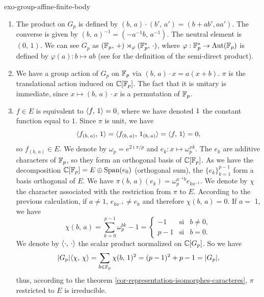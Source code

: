  
\begin{correction}{exo-group-affine-finite-body}
\begin{enumerate}
\item The product on $ G_p $ is defined by $ (b, \, a) \cdot (b', \, a') = (b + ab', aa') $. The converse is given by $ (b, \, a)^{-1} = (-a^{-1} b, \, a^{-1}) $. The neutral element is $ (0, \, 1) $. We can see $ G_p $ as $ (\mathbb{F}_p, \, +) \rtimes_\varphi (\mathbb{F}_p^*, \, \cdot) $, where $ \varphi: \mathbb{F}_p^* \rightarrow \text{Aut} ( \mathbb{F}_p) $ is defined by $ \varphi (a): b \mapsto ab $ (see \cite{perrin} for the definition of the semi-direct product).
\item {} We have a group action of $ G_p $ on $ \mathbb{F}_p $ via $ (b, \, a) \cdot x = a (x + b) $. $ \pi $ is the translational action induced on $ \mathbb{C} [\mathbb{F}_p] $. The fact that it is unitary is immediate, since $ x \mapsto (b, \, a) \cdot x $ is a permutation of $ \mathbb{F}_p $.
\item $ f \in E $ is equivalent to $ \langle f,\,1\rangle = 0 $, where we have denoted $ 1 $ the constant function equal to $ 1 $. Since $ \pi $ is unit, we have
\begin{equation*}
\langle f_{(b, \, a)},\,1\rangle = \langle f_{(b, \, a)},\,1_{(b, \, a )}\rangle = \langle f,\,1\rangle = 0,
\end{equation*}
so $ f_{(b, \, a)} \in E $. We denote by $ \omega_p = e^{2 \imath \pi/p} $ and $ e_k: x \mapsto \omega_p^{xk} $. The $ e_k $ are additive characters of $ \mathbb{F}_p $, so they form an orthogonal basis of $ \mathbb{C} [\mathbb{F}_p] $. As we have the decomposition $ \mathbb{C} [\mathbb{F}_p] = E \oplus \operatorname{Span} (e_0) $ (orthogonal sum), the $ \{e_k\}_{k = 1}^{p-1} $ form a basis orthogonal of $ E $. We have $ \pi (b, \, a) (e_k) = \omega_p^{a^{-1} b} e_{ka^{-1}} $. We denote by $ \chi $ the character associated with the restriction from $ \pi $ to $ E $. According to the previous calculation, if $ a \neq 1 $, $ e_{ka^{-1}} \neq e_k $ and therefore $ \chi (b, \, a) = 0 $. If $ a = $ 1, we have
\begin{equation*}
\chi (b, \, a) = \sum_{k = 0}^{p-1}{\omega_p^{bk}}-1 = \left\{\begin{array}{lll} -1 & \text{si} & b \neq 0, \\p-1 & \text{si} & b = 0. \end{array} \right.
\end{equation*}
We denote by $ \langle \cdot,\,\cdot\rangle $ the scalar product normalized on $ \mathbb{C} [G_p] $. So we have
\begin{equation*}
| G_p | \langle \chi,\,\chi\rangle = \sum_{b \in \mathbb{F}_p}{\chi (b, \, 1)^2} = (p-1)^2 + p-1 = | G_p |,
\end{equation*}
thus, according to the theorem \ref{cor-representation-isomorphes-caracteres}, $ \pi $ restricted to $ E $ is irreducible.
\end{enumerate}
\end{correction}
 
